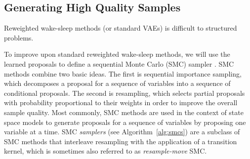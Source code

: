 \documentclass{article}
\theoremstyle{definition}
\begin{document}
\subsection{Generating High Quality Samples}
Reweighted wake-sleep methods (or standard VAEs) is difficult to structured problems.  




To improve upon standard reweighted wake-sleep methods, we will use the learned proposals to define a sequential Monte Carlo (SMC) sampler \cite{delmoral2006sequential}. %
SMC methods \cite{doucet2001sequential} combine two basic ideas. The first is sequential importance sampling, which decomposes a proposal for a sequence of variables into a sequence of conditional proposals. The second is resampling, which selects partial proposals with probability proportional to their weights in order to improve the overall sample quality. Most commonly, SMC methods are used in the context of state space models to generate proposals for a sequence of variables by proposing one variable at a time. SMC \emph{samplers} (see  Algorithm~\ref{alg:smcs}) are a subclass of SMC methods that interleave resampling with the application of a transition kernel, which is sometimes also referred to as \emph{resample-move} SMC. 
\end{document}
